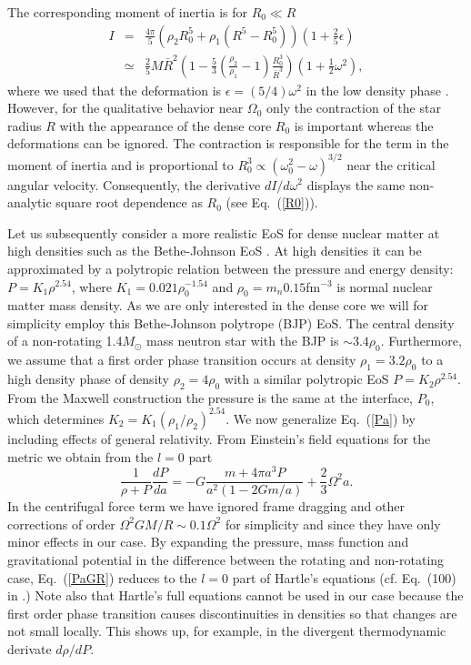 \begin{multicols}{2}
The corresponding moment of inertia is for $R_0\ll R$  
\begin{eqnarray}
   I &=& \frac{4\pi}{5} \left( \rho_2R_0^5+\rho_1(R^5-R_0^5)\right)
     (1+\frac{2}{5}\epsilon) \nonumber \\
     &\simeq& \frac{2}{5}M\bar{R}^2 
    \left( 1-\frac{5}{3}(\frac{\rho_2}{\rho_1}-1)\frac{R_0^3}{\bar{R}^3}\right)
      (1+\frac{1}{2}\omega^2),
    \label{I}
\end{eqnarray}
where we used that the deformation is $\epsilon=(5/4)\omega^2$ in the low
density phase \cite{Tassoul}. 
However, for the qualitative behavior near $\Omega_0$ only the contraction
of the star radius $R$ with the appearance of the dense core $R_0$
is important whereas the deformations can be ignored.
The contraction is responsible for the term in
the moment of inertia and is proportional to
$R_0^3\propto (\omega_0^2-\omega)^{3/2}$ near the critical angular
velocity. Consequently,  the derivative $dI/d\omega^2$ displays the same
non-analytic square root dependence as $R_0$ (see Eq.\ (\ref{R0})). 

Let us subsequently 
consider a more realistic EoS for dense nuclear matter at high
densities such as the Bethe-Johnson EoS \cite{BJ}. At
high densities it can be approximated by a polytropic relation between
the pressure and energy density:
$P=K_1\rho^{2.54}$, where 
$K_1=0.021\rho_0^{-1.54}$ and $\rho_0=m_n 0.15$fm$^{-3}$
is normal nuclear matter mass density. 
As we are only interested in the dense core we will for simplicity employ 
this Bethe-Johnson polytrope (BJP) EoS.
The central density of a non-rotating
1.4$M_\odot$
mass neutron star with the BJP is $\sim 3.4\rho_0$.
Furthermore, we assume that a first order phase
transition occurs at density $\rho_1=3.2\rho_0$ to a high density phase
of density $\rho_2=4\rho_0$ with a similar polytropic 
EoS $P=K_2\rho^{2.54}$. From the Maxwell
construction the pressure is the same at the interface, $P_0$,
which determines $K_2=K_1(\rho_1/\rho_2)^{2.54}$. 
We now generalize Eq.\   (\ref{Pa}) by including 
effects of general relativity. From Einstein's field equations for the metric
we obtain from the $l=0$ part 
\begin{equation}
  \frac{1}{\rho+P}\frac{dP}{da} = - G\frac{m+4\pi a^3P}{a^2(1-2Gm/a)} 
                    + \frac{2}{3}\Omega^2 a . 
  \label{PaGR}
\end{equation}
In the centrifugal force term
we have ignored frame dragging and other corrections of order
$\Omega^2GM/R\sim 0.1\Omega^2$ for simplicity and 
since they have only minor effects in our case.
By expanding the pressure, mass function and gravitational potential
in the difference between the rotating and non-rotating case, 
Eq.\  (\ref{PaGR}) reduces to the $l=0$ part of
Hartle's equations (cf. Eq.\  (100) in \cite{Hartle}.)
Note also that Hartle's full 
equations cannot be used in our case because the first order
phase transition causes discontinuities in densities so that changes
are not small locally. This shows up, for example, in the divergent
thermodynamic derivate $d\rho/dP$.


\end{multicols}
